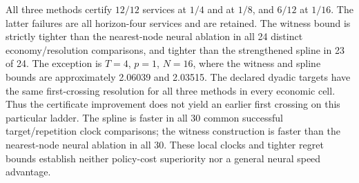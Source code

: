 All three methods certify $12/12$ services at $1/4$ and at $1/8$, and $6/12$ at $1/16$. The latter failures are all horizon-four services and are retained. The witness bound is strictly tighter than the nearest-node neural ablation in all 24 distinct economy/resolution comparisons, and tighter than the strengthened spline in 23 of 24. The exception is $T=4$, $p=1$, $N=16$, where the witness and spline bounds are approximately 2.06039 and 2.03515. The declared dyadic targets have the same first-crossing resolution for all three methods in every economic cell. Thus the certificate improvement does not yield an earlier first crossing on this particular ladder. The spline is faster in all 30 common successful target/repetition clock comparisons; the witness construction is faster than the nearest-node neural ablation in all 30. These local clocks and tighter regret bounds establish neither policy-cost superiority nor a general neural speed advantage.
